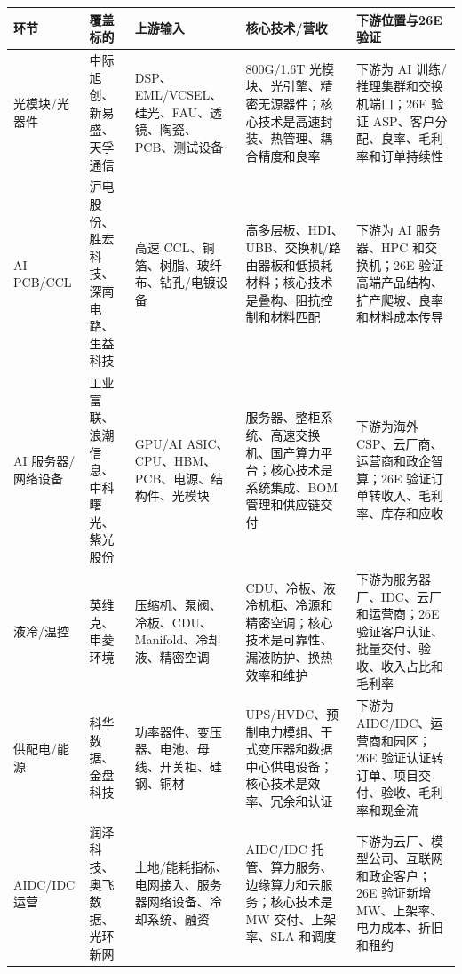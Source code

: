 \begin{exhibitbox}
\scriptsize
\begin{tabularx}{\textwidth}{L{2.0cm}L{2.2cm}X X X}
\toprule
\textbf{环节} & \textbf{覆盖标的} & \textbf{上游输入} & \textbf{核心技术/营收} & \textbf{下游位置与26E验证}\\
\midrule
光模块/光器件 & 中际旭创、新易盛、天孚通信 & DSP、EML/VCSEL、硅光、FAU、透镜、陶瓷、PCB、测试设备 & 800G/1.6T 光模块、光引擎、精密无源器件；核心技术是高速封装、热管理、耦合精度和良率 & 下游为 AI 训练/推理集群和交换机端口；26E 验证 ASP、客户分配、良率、毛利率和订单持续性\\
AI PCB/CCL & 沪电股份、胜宏科技、深南电路、生益科技 & 高速 CCL、铜箔、树脂、玻纤布、钻孔/电镀设备 & 高多层板、HDI、UBB、交换机/路由器板和低损耗材料；核心技术是叠构、阻抗控制和材料匹配 & 下游为 AI 服务器、HPC 和交换机；26E 验证高端产品结构、扩产爬坡、良率和材料成本传导\\
AI 服务器/网络设备 & 工业富联、浪潮信息、中科曙光、紫光股份 & GPU/AI ASIC、CPU、HBM、PCB、电源、结构件、光模块 & 服务器、整柜系统、高速交换机、国产算力平台；核心技术是系统集成、BOM 管理和供应链交付 & 下游为海外 CSP、云厂商、运营商和政企智算；26E 验证订单转收入、毛利率、库存和应收\\
液冷/温控 & 英维克、申菱环境 & 压缩机、泵阀、冷板、CDU、Manifold、冷却液、精密空调 & CDU、冷板、液冷机柜、冷源和精密空调；核心技术是可靠性、漏液防护、换热效率和维护 & 下游为服务器厂、IDC、云厂和运营商；26E 验证客户认证、批量交付、验收、收入占比和毛利率\\
供配电/能源 & 科华数据、金盘科技 & 功率器件、变压器、电池、母线、开关柜、硅钢、铜材 & UPS/HVDC、预制电力模组、干式变压器和数据中心供电设备；核心技术是效率、冗余和认证 & 下游为 AIDC/IDC、运营商和园区；26E 验证认证转订单、项目交付、验收、毛利率和现金流\\
AIDC/IDC 运营 & 润泽科技、奥飞数据、光环新网 & 土地/能耗指标、电网接入、服务器网络设备、冷却系统、融资 & AIDC/IDC 托管、算力服务、边缘算力和云服务；核心技术是 MW 交付、上架率、SLA 和调度 & 下游为云厂、模型公司、互联网和政企客户；26E 验证新增 MW、上架率、电力成本、折旧和租约\\
\bottomrule
\end{tabularx}
\end{exhibitbox}

